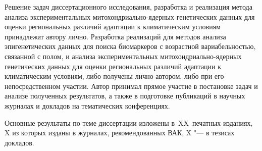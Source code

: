 {\contribution} Решение задач диссертационного исследования, разработка и реализация метода анализа экспериментальных митохондриально-ядерных генетических данных для оценки региональных различий адаптации к климатическим условиям принадлежат автору лично. Разработка реализаций для методов анализа эпигенетических данных для поиска биомаркеров с возрастной вариабельностью, связанной с полом, и анализа экспериментальных митохондриально-ядерных генетических данных для оценки региональных различий адаптации к климатическим условиям, либо получены лично автором, либо при его непосредственном участии. Автор принимал прямое участие в постановке задач и анализе полученных результатов, а также в подготовке публикаций в научных журналах и докладов на тематических конференциях.

{%
    {\publications} Основные результаты по теме диссертации изложены
    в~XX~печатных изданиях,
    X из которых изданы в журналах, рекомендованных ВАК,
    X "--- в тезисах докладов.
}%
